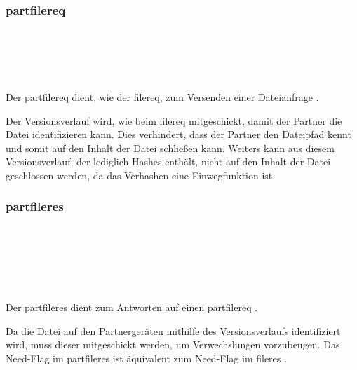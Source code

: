 \subsubsection{\gls{partfilereq}} \label{partnerfilerequest}
\messagestart
	\begin{rightwordgroup}{\isprotomsgtype}
	\end{rightwordgroup} \\
	
	\begin{rightwordgroup}{\isprotomsgdata}
		 \\
		\skippedwords \\
	\end{rightwordgroup}
Der \gls{partfilereq} dient, wie der \gls{filereq}, zum Versenden einer Dateianfrage .
\begin{description}
	Der Versionsverlauf wird, wie beim \gls{filereq} mitgeschickt, damit der Partner die Datei identifizieren kann. Dies verhindert, dass der Partner den Dateipfad kennt und somit auf den Inhalt der Datei schließen kann. Weiters kann aus diesem Versionsverlauf, der lediglich Hashes enthält, nicht auf den Inhalt der Datei geschlossen werden, da das Verhashen eine Einwegfunktion ist. 
\end{description}

\subsubsection{\gls{partfileres}}
\messagestart
	\begin{rightwordgroup}{\isprotomsgtype}
	\end{rightwordgroup} \\
	
	\begin{rightwordgroup}{\isprotomsgdata}
		 \\
		\skippedwords \\
		\\
	\end{rightwordgroup}
Der \gls{partfileres} dient zum Antworten auf einen \gls{partfilereq} .

\begin{description}
	Da die Datei auf den Partnergeräten mithilfe des Versionsverlaufs identifiziert wird, muss dieser mitgeschickt werden, um Verwechslungen vorzubeugen.
	Das Need-Flag im \gls{partfileres} ist äquivalent zum Need-Flag im \gls{fileres} .
\end{description}

